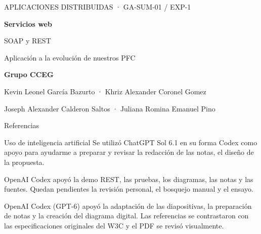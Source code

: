 \documentclass[aspectratio=169,11pt]{beamer}
\begin{document}
\begingroup
{}
\begin{frame}
\vspace{5mm}
{\color{suave}\small APLICACIONES DISTRIBUIDAS · GA-SUM-01 / EXP-1}\par
\vspace{8mm}
{\color{white}\fontsize{34}{38}\selectfont\bfseries Servicios web}\par
\vspace{2mm}
{\color{white}\fontsize{27}{31}\selectfont SOAP y REST}\par
\vspace{5mm}
{\color{suave}\large Aplicación a la evolución de nuestros PFC}\par
\vfill
{\color{white}\small\bfseries Grupo CCEG}\par\smallskip
{\color{white}\footnotesize Kevin Leonel García Bazurto · Khriz Alexander Coronel Gomez\par
Joseph Alexander Calderon Saltos · Juliana Romina Emanuel Pino}\par
\vspace{5mm}
\end{frame}
\endgroup

\begin{frame}{Referencias}
\footnotesize\printbibliography[heading=none]
\end{frame}
\begin{frame}[noframenumbering]{Uso de inteligencia artificial}
Se utilizó ChatGPT Sol 6.1 en su forma Codex como apoyo para ayudarme a preparar y revisar la redacción de las notas, el diseño de la propuesta.
\par\medskip
{}
OpenAI Codex apoyó la demo REST, las pruebas, los diagramas, las notas y las fuentes. Quedan pendientes la revisión personal, el bosquejo manual y el ensayo.
\par\medskip
{}
OpenAI Codex (GPT-6) apoyó la adaptación de las diapositivas, la preparación de notas y la creación del diagrama digital. Las referencias se contrastaron con las especificaciones originales del W3C y el PDF se revisó visualmente.
\end{frame}
\end{document}
